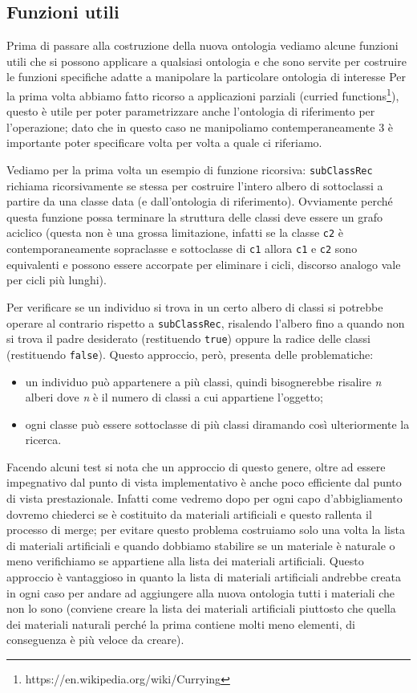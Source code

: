 \subsection{Funzioni utili}
Prima di passare alla costruzione della nuova ontologia vediamo alcune funzioni utili che si possono applicare a qualsiasi ontologia e che sono servite per costruire le funzioni specifiche adatte a manipolare la particolare ontologia di interesse
Per la prima volta abbiamo fatto ricorso a applicazioni parziali (curried functions\footnote{https://en.wikipedia.org/wiki/Currying}), questo è utile per poter parametrizzare anche l'ontologia di riferimento per l'operazione; dato che in questo caso ne manipoliamo contemperaneamente 3 è importante poter specificare volta per volta a quale ci riferiamo.

Vediamo per la prima volta un esempio di funzione ricorsiva: \verb|subClassRec| richiama ricorsivamente se stessa per costruire l'intero albero di sottoclassi a partire da una classe data (e dall'ontologia di riferimento). Ovviamente perché questa funzione possa terminare la struttura delle classi deve essere un grafo aciclico (questa non è una grossa limitazione, infatti se la classe \verb|c2| è contemporaneamente sopraclasse e sottoclasse di \verb|c1| allora \verb|c1| e \verb|c2| sono equivalenti e possono essere accorpate per eliminare i cicli, discorso analogo vale per cicli più lunghi).

Per verificare se un individuo si trova in un certo albero di classi si potrebbe operare al contrario rispetto a \verb|subClassRec|, risalendo l'albero fino a quando non si trova il padre desiderato (restituendo \verb|true|) oppure la radice delle classi (restituendo \verb|false|). Questo approccio, però, presenta delle problematiche:
\begin{itemize}
	\item un individuo può appartenere a più classi, quindi bisognerebbe risalire \emph{n} alberi dove \emph{n} è il numero di classi a cui appartiene l'oggetto;
	\item ogni classe può essere sottoclasse di più classi diramando così ulteriormente la ricerca.
\end{itemize}
Facendo alcuni test si nota che un approccio di questo genere, oltre ad essere impegnativo dal punto di vista implementativo è anche poco efficiente dal punto di vista prestazionale. Infatti come vedremo dopo per ogni capo d'abbigliamento dovremo chiederci se è costituito da materiali artificiali e questo rallenta il processo di merge; per evitare questo problema costruiamo solo una volta la lista di materiali artificiali e quando dobbiamo stabilire se un materiale è naturale o meno verifichiamo se appartiene alla lista dei materiali artificiali. Questo approccio è vantaggioso in quanto la lista di materiali artificiali andrebbe creata in ogni caso per andare ad aggiungere alla nuova ontologia tutti i materiali che non lo sono (conviene creare la lista dei materiali artificiali piuttosto che quella dei materiali naturali perché la prima contiene molti meno elementi, di conseguenza è più veloce da creare). 